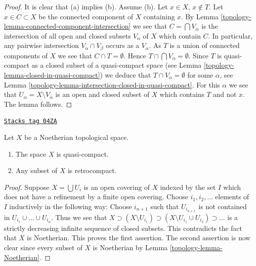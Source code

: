 \begin{proof}

It is clear that (a) implies (b).
Assume (b). Let $x \in X$, $x \not \in T$. Let $x \in C \subset X$
be the connected component of $X$ containing $x$. By
Lemma \ref{topology-lemma-connected-component-intersection}
we see that $C = \bigcap V_\alpha$ is the intersection of all open and
closed subsets $V_\alpha$ of $X$ which contain $C$.
In particular, any pairwise intersection $V_\alpha \cap V_\beta$
occurs as a $V_\alpha$.
As $T$ is a union of connected components
of $X$ we see that $C \cap T = \emptyset$. Hence
$T \cap \bigcap V_\alpha = \emptyset$. Since $T$ is quasi-compact as a
closed subset of a quasi-compact space (see
Lemma \ref{topology-lemma-closed-in-quasi-compact})
we deduce that $T \cap V_\alpha = \emptyset$ for some $\alpha$, see
Lemma \ref{topology-lemma-intersection-closed-in-quasi-compact}.
For this $\alpha$ we see that $U_\alpha = X \setminus V_\alpha$
is an open and closed subset of $X$ which contains $T$ and not $x$.
The lemma follows.
\end{proof}

\begin{lemma}
\label{topology-lemma-Noetherian-quasi-compact}
\href{https://stacks.math.columbia.edu/tag/04ZA}{\texttt{Stacks tag 04ZA}}

Let $X$ be a Noetherian topological space.
\begin{enumerate}
\item The space $X$ is quasi-compact.
\item Any subset of $X$ is retrocompact.
\end{enumerate}
\end{lemma}

\begin{proof}

Suppose $X = \bigcup U_i$ is an open covering of $X$ indexed
by the set $I$ which does not have a refinement by a finite
open covering. Choose $i_1, i_2, \ldots $ elements of $I$ inductively
in the following way: Choose $i_{n + 1}$ such that $U_{i_{n + 1}}$
is not contained in $U_{i_1} \cup \ldots \cup U_{i_n}$. Thus we see that
$X \supset (X \setminus U_{i_1}) \supset
(X \setminus U_{i_1} \cup U_{i_2}) \supset \ldots$ is a strictly
decreasing infinite sequence of closed subsets. This contradicts
the fact that $X$ is Noetherian. This proves the first assertion.
The second assertion is now clear since every subset of $X$ is Noetherian by
Lemma \ref{topology-lemma-Noetherian}.
\end{proof}

